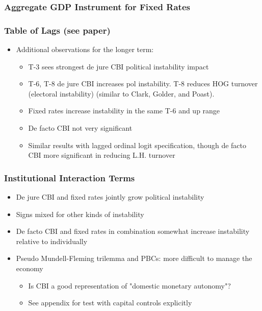 \documentclass{beamer}
\begin{document}
    \begin{frame}
        \frametitle{Aggregate GDP Instrument for Fixed Rates}
        {
            \let\oldcentering\centering
            \renewcommand\centering{\tiny\oldcentering}
            
        }
    \end{frame}

    \begin{frame}
        \frametitle{Table of Lags (see paper)}
        \begin{itemize}
            \item Additional observations for the longer term:
            \begin{itemize}
                \item T-3 sees strongest de jure CBI political instability impact
                \item T-6, T-8 de jure CBI increases pol instability. T-8 reduces HOG turnover (electoral instability) (similar to Clark, Golder, and Poast).
                \item Fixed rates increase instability in the same T-6 and up range
                \item De facto CBI not very significant
                \item Similar results with lagged ordinal logit specification, though de facto CBI more significant in reducing L.H. turnover
            \end{itemize}
        \end{itemize}
    \end{frame}

    \begin{frame}
        \frametitle{Institutional Interaction Terms}
        \begin{itemize}
            \item De jure CBI and fixed rates jointly grow political instability
            \item Signs mixed for other kinds of instability
            \item De facto CBI and fixed rates in combination somewhat increase instability relative to individually
            \item Pseudo Mundell-Fleming trilemma and PBCs: more difficult to manage the economy
            \begin{itemize}
                \item Is CBI a good representation of "domestic monetary autonomy"?
                \item See appendix for test with capital controls explicitly
            \end{itemize}
        \end{itemize}
    \end{frame}
\end{document}
